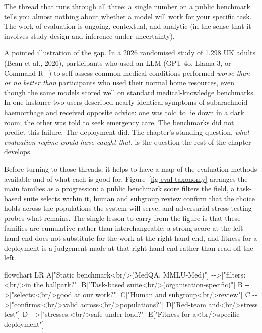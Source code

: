 \documentclass[
  letterpaper,
  11pt]{scrbook}
\newenvironment{Shaded}{\begin{snugshade}}{\end{snugshade}}
\newcommand{\NormalTok}[1]{\textcolor[rgb]{0.00,0.23,0.31}{#1}}
\begin{document}
The thread that runs through all three: a single number on a public
benchmark tells you almost nothing about whether a model will work for
your specific task. The work of evaluation is ongoing, contextual, and
analytic (in the sense that it involves study design and inference under
uncertainty).

A pointed illustration of the gap. In a 2026 randomised study of 1,298
UK adults ({Bean et al.}, 2026), participants who used an LLM (GPT-4o,
Llama 3, or Command R+) to self-assess common medical conditions
performed \emph{worse than or no better than} participants who used
their normal home resources, even though the same models scored well on
standard medical-knowledge benchmarks. In one instance two users
described nearly identical symptoms of subarachnoid haemorrhage and
received opposite advice: one was told to lie down in a dark room; the
other was told to seek emergency care. The benchmarks did not predict
this failure. The deployment did. The chapter's standing question,
\emph{what evaluation regime would have caught that}, is the question
the rest of the chapter develops.

Before turning to those threads, it helps to have a map of the
evaluation methods available and of what each is good for.
Figure~\ref{fig-eval-taxonomy} arranges the main families as a
progression: a public benchmark score filters the field, a task-based
suite selects within it, human and subgroup review confirm that the
choice holds across the populations the system will serve, and
adversarial stress testing probes what remains. The single lesson to
carry from the figure is that these families are cumulative rather than
interchangeable; a strong score at the left-hand end does not substitute
for the work at the right-hand end, and fitness for a deployment is a
judgement made at that right-hand end rather than read off the left.

\begin{Shaded}
\begin{Highlighting}[]
\NormalTok{flowchart LR}
\NormalTok{  A["Static benchmark\textless{}br/\textgreater{}(MedQA, MMLU{-}Med)"] {-}{-}\textgreater{}|"filters:\textless{}br/\textgreater{}in the ballpark?"| B["Task{-}based suite\textless{}br/\textgreater{}(organisation{-}specific)"]}
\NormalTok{  B {-}{-}\textgreater{}|"selects:\textless{}br/\textgreater{}good at our work?"| C["Human and subgroup\textless{}br/\textgreater{}review"]}
\NormalTok{  C {-}{-}\textgreater{}|"confirms:\textless{}br/\textgreater{}valid across\textless{}br/\textgreater{}populations?"| D["Red{-}team and\textless{}br/\textgreater{}stress test"]}
\NormalTok{  D {-}{-}\textgreater{}|"stresses:\textless{}br/\textgreater{}safe under load?"| E["Fitness for a\textless{}br/\textgreater{}specific deployment"]}
\end{Highlighting}
\end{Shaded}
\end{document}
